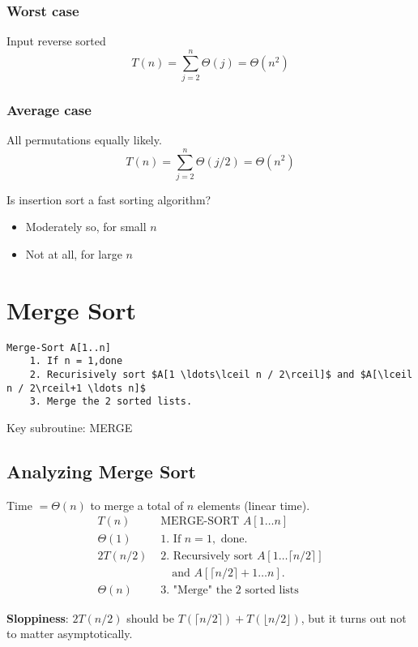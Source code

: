 \documentclass[11pt]{elegantbook}
\begin{document}
\subsubsection*{Worst case}
Input reverse sorted
$$
T(n)=\sum_{j=2}^{n} \Theta(j)=\Theta\left(n^{2}\right)
$$
\subsubsection*{Average case}
All permutations equally likely.
$$
T(n)=\sum_{j=2}^{n} \Theta(j / 2)=\Theta\left(n^{2}\right)
$$

\begin{note}
  Is insertion sort a fast sorting algorithm?
  \begin{itemize}
    \item Moderately so, for small $n$
    \item Not at all, for large $n$
  \end{itemize}
\end{note}

\section{Merge Sort}

\begin{lstlisting}[mathescape=true]
  Merge-Sort A[1..n]
    1. If n = 1,done
    2. Recurisively sort $A[1 \ldots\lceil n / 2\rceil]$ and $A[\lceil n / 2\rceil+1 \ldots n]$
    3. Merge the 2 sorted lists.
\end{lstlisting}
\begin{note}
  Key subroutine: MERGE
\end{note}  
\subsection{Analyzing Merge Sort}
Time $=\Theta(n)$ to merge a total of $n$ elements (linear time).
$$
\begin{array}{l|l}
T(n) & \text { MERGE-SORT } A[1 \ldots n] \\
\Theta(1) & \text { 1. If } n=1, \text { done. } \\
2 T(n / 2) & \text { 2. Recursively sort } A[1 \ldots\lceil n / 2\rceil] \\
& \quad \text { and } A[\lceil n / 2\rceil+1 \ldots n] . \\
\Theta(n) & \text { 3. "Merge" the } 2 \text { sorted lists }
\end{array}
$$
\begin{note}
  \textbf{Sloppiness}: $2T(n/2)$ should be $T(\lceil n / 2\rceil)+T(\lfloor n / 2\rfloor)$, but it turns out not to matter asymptotically.
\end{note}
\end{document}
